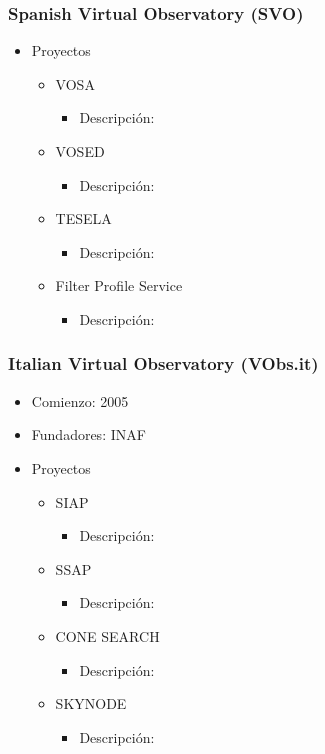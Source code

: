 \subsubsection{Spanish Virtual Observatory (SVO)}
	\begin{itemize}
		\item Proyectos
		\begin{itemize}
			\item VOSA
			\begin{itemize}
				\item Descripción: 
			\end{itemize}
			\item VOSED
			\begin{itemize}
				\item Descripción: 
			\end{itemize}
			\item TESELA
			\begin{itemize}
				\item Descripción: 
			\end{itemize}
			\item Filter Profile Service
			\begin{itemize}
				\item Descripción: 
			\end{itemize}
		\end{itemize}
	\end{itemize}

\subsubsection{Italian Virtual Observatory (VObs.it)}
	\begin{itemize}
		\item Comienzo: 2005
		\item Fundadores: INAF
		\item Proyectos
		\begin{itemize}
			\item SIAP
			\begin{itemize}
				\item Descripción: 
			\end{itemize}
			\item SSAP
			\begin{itemize}
				\item Descripción: 
			\end{itemize}
			\item CONE SEARCH
			\begin{itemize}
				\item Descripción: 
			\end{itemize}
			\item SKYNODE
			\begin{itemize}
				\item Descripción: 
			\end{itemize}
		\end{itemize}
	\end{itemize}

